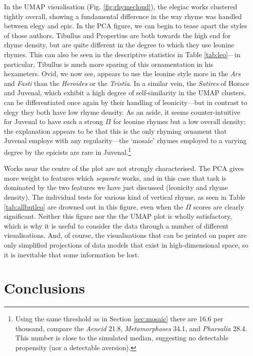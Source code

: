 \documentclass[twocolumn, switch, a4paper]{article} %
\begin{document}
In the UMAP visualisation (Fig. \ref{fig:rhymecloud}), the elegiac works
clustered tightly overall, showing a fundamental difference in the way rhyme
was handled between elegy and epic. In the PCA figure, we can begin to tease
apart the styles of those authors. Tibullus and Propertius are both towards
the high end for rhyme density, but are quite different in the degree to which
they use leonine rhymes. This can also be seen in the descriptive statistics
in Table \ref{tab:leo}---in particular, Tibullus is much more sparing of this
ornamentation in his hexameters. Ovid, we now see, appears to use the leonine
style more in the \emph{Ars} and \emph{Fasti} than the \emph{Heroides} or the
\emph{Tristia}. In a similar vein, the \emph{Satires} of Horace and Juvenal,
which exhibit a high degree of self-similarity in the UMAP clusters, can be
differentiated once again by their handling of leonicity---but in contrast to
elegy they both have low rhyme density. As an aside, it seems
counter-intuitive for Juvenal to have such a strong $\Pi$ for leonine rhymes
but a low overall density; the explanation appears to be that this is the only
rhyming ornament that Juvenal employs with any regularity---the `mosaic' rhymes
employed to a varying degree by the epicists are rare in Juvenal.\footnote{
  Using the same threshold as in Section \ref{sec:mosaic} there are 16.6 per
  thousand, compare the \emph{Aeneid} 21.8, \emph{Metamorphoses} 34.1, and
  \emph{Pharsalia} 28.4. This number is close to the simulated median,
  suggesting no detectable propensity (nor a detectable aversion).
}

Works near the centre of the plot are not strongly characterised. The PCA
gives more weight to features which \emph{separate} works, and in this case
that task is dominated by the two features we have just discussed (leonicity
and rhyme density). The individual tests for various kind of vertical rhyme,
as seen in Table \ref{tab:allbutleo} are drowned out in this figure, even when
the $\Pi$ scores are clearly significant. Neither this figure nor the the UMAP
plot is wholly satisfactory, which is why it is useful to consider the data
through a number of different visualisations. And, of course, the
visualisations that can be printed on paper are only simplified projections of
data models that exist in high-dimensional space, so it is inevitable that
some information be lost.

\section{Conclusions}
\label{sec:conclusion}
\end{document}
